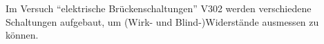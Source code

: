Im Versuch \enquote{elektrische Brückenschaltungen} V302 werden verschiedene Schaltungen aufgebaut, um (Wirk- und Blind-)Widerstände ausmessen zu können. 
